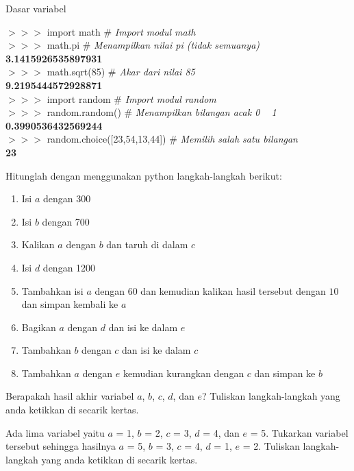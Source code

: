\begin{panduan}{Dasar variabel}
\begin{enumerate}
\begin{IDLE}
\begin{tabbing}
		$>>>$ import math \> \# \textit{Import modul math}\\
		$>>>$ math.pi \> \# \textit{Menampilkan nilai pi (tidak semuanya)}\\
		\textbf{3.1415926535897931}\\
		$>>>$ math.sqrt(85) \> \# \textit{Akar dari nilai 85}\\
		\textbf{9.2195444572928871} \\
		$>>>$ import random \> \# \textit{Import modul random}\\
		$>>>$ random.random() \> \# \textit{Menampilkan bilangan acak 0 ~ 1}\\
		\textbf{0.3990536432569244}\\
		$>>>$ random.choice([23,54,13,44]) \> \# \textit{Memilih salah satu bilangan}\\
		\textbf{23}\\
		\end{tabbing}
	\end{IDLE}
\end{enumerate}
\end{panduan}

\begin{latihan}
Hitunglah dengan menggunakan python langkah-langkah berikut:
\begin{enumerate}
	\item Isi $a$ dengan 300
	\item Isi $b$ dengan 700
	\item Kalikan $a$ dengan $b$ dan taruh di dalam $c$
	\item Isi $d$ dengan 1200
	\item Tambahkan isi $a$ dengan 60 dan kemudian kalikan hasil tersebut dengan $10$ dan simpan kembali ke $a$   
	\item Bagikan $a$ dengan $d$ dan isi ke dalam $e$
	\item Tambahkan $b$ dengan $c$ dan isi ke dalam $c$
	\item Tambahkan $a$ dengan $e$ kemudian kurangkan dengan $c$ dan simpan ke $b$
\end{enumerate}
Berapakah hasil akhir variabel $a$, $b$, $c$, $d$, dan $e$? 
Tuliskan langkah-langkah yang anda ketikkan di secarik kertas.
\end{latihan}

\begin{latihan}
Ada lima variabel yaitu $a$ = 1, $b$ = 2, $c$ = 3, $d$ = 4, dan $e$ = 5. Tukarkan variabel tersebut sehingga hasilnya $a$ = 5, $b$ = 3, $c$ = 4, $d$ = 1, $e$ = 2. Tuliskan langkah-langkah yang anda ketikkan di secarik kertas. 
\end{latihan}

